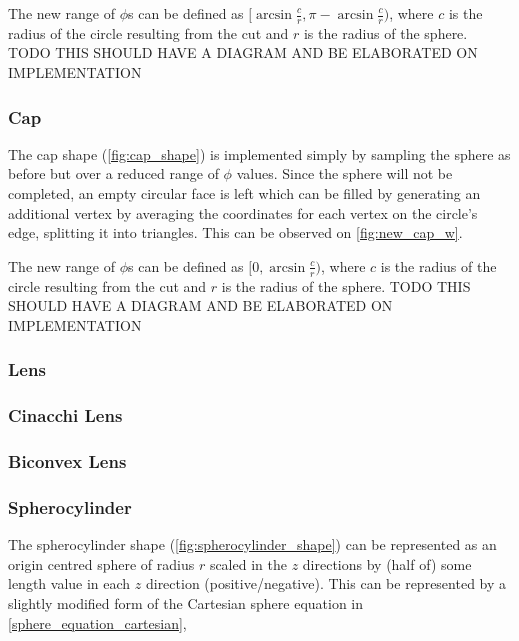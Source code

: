 The new range of $\phi$s can be defined as $[\arcsin\frac{c}{r}, \pi - \arcsin\frac{c}{r})$, where $c$ is the radius of the circle resulting from the cut and $r$ is the radius of the sphere. TODO THIS SHOULD HAVE A DIAGRAM AND BE ELABORATED ON IMPLEMENTATION

\subsubsection{Cap}
The cap shape (\cref{fig:cap_shape}) is implemented simply by sampling the sphere as before but over a reduced range of $\phi$ values. Since the sphere will not be completed, an empty circular face is left which can be filled by generating an additional vertex by averaging the coordinates for each vertex on the circle's edge, splitting it into triangles. This can be observed on \cref{fig:new_cap_w}.

The new range of $\phi$s can be defined as $[0, \arcsin\frac{c}{r})$, where $c$ is the radius of the circle resulting from the cut and $r$ is the radius of the sphere. TODO THIS SHOULD HAVE A DIAGRAM AND BE ELABORATED ON IMPLEMENTATION

\subsubsection{Lens}

\subsubsection{Cinacchi Lens}

\subsubsection{Biconvex Lens}

\subsubsection{Spherocylinder}
The spherocylinder shape (\cref{fig:spherocylinder_shape}) can be represented as an origin centred sphere of radius $r$ scaled in the $z$ directions by (half of) some length value in each $z$ direction (positive/negative). This can be represented by a slightly modified form of the Cartesian sphere equation in \cref{sphere_equation_cartesian},

